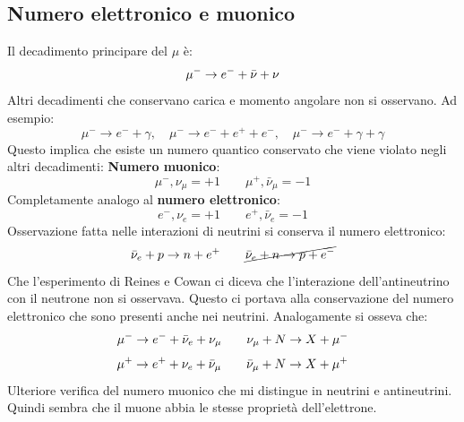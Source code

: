 \subsection{Numero elettronico e muonico}
Il decadimento principare del $\mu$ è:
\begin{equation*}
    \mu^-\to e^-+\Bar{\nu}+\nu
\end{equation*} 
Altri decadimenti che conservano carica e momento angolare non si osservano. Ad esempio:
\begin{equation*}
    \mu^-\to e^-+\gamma, \quad \mu^-\to e^-+e^++e^-, \quad \mu^-\to e^-+\gamma+\gamma
\end{equation*}
Questo implica che esiste un numero quantico conservato che viene violato negli altri decadimenti: \textbf{Numero muonico}:
\begin{equation*}
    \mu^-,\nu_\mu=+1 \qquad \mu^+,\bar{\nu}_\mu=-1
\end{equation*}
Completamente analogo al \textbf{numero elettronico}:
\begin{equation*}
    e^-,\nu_e=+1 \qquad  e^+,\bar{\nu}_e=-1
\end{equation*}
Osservazione fatta nelle interazioni di neutrini si conserva il numero elettronico:
\begin{equation*}
    \Bar{\nu}_e+p\to n+e^+ \qquad \cancel{ \Bar{\nu}_e+n\to p+e^-}
\end{equation*}
Che l'esperimento di Reines e Cowan ci diceva che l'interazione dell'antineutrino con il neutrone non si osservava. Questo ci portava alla conservazione del numero elettronico che sono presenti anche nei neutrini. Analogamente si osseva che:
\begin{equation*}
    \mu^-\to e^-+\Bar{\nu}_e+\nu_\mu \qquad \nu_\mu+N\to X+\mu^-
\end{equation*}
\begin{equation*}
    \mu^+\to e^++\nu_e+\Bar{\nu}_\mu \qquad \Bar{\nu}_\mu+N\to X+\mu^+
\end{equation*}
Ulteriore verifica del numero muonico che mi distingue in neutrini e antineutrini. Quindi sembra che il muone abbia le stesse proprietà dell'elettrone.
